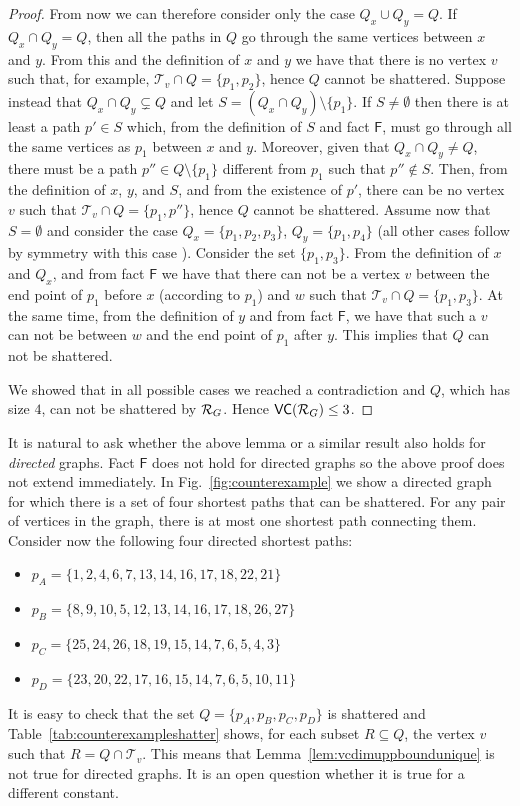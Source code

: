 \begin{proof}
  From now we can therefore consider only the case $Q_x\cup Q_y=Q$. If $Q_x\cap
  Q_y=Q$, then all the paths in $Q$ go through the same vertices between $x$ and
  $y$. From this and the definition of $x$ and $y$ we have that there is no
  vertex $v$ such that, for example, $\mathcal{T}_v\cap Q=\{p_1,p_2\}$, hence
  $Q$ cannot be shattered. Suppose instead that $Q_x\cap Q_y\subsetneq Q$ and let $S=(Q_x\cap
  Q_y)\setminus\{p_1\}$. If $S\neq\emptyset$ then there is at least a path
  $p'\in S$ which, from the definition of $S$ and fact $\mathsf{F}$, must go
  through all the same vertices as $p_1$ between $x$ and $y$. Moreover, given
  that $Q_x\cap Q_y\neq Q$, there must be a path $p''\in Q\setminus\{p_1\}$
  different from $p_1$ such that $p''\notin S$. Then, from the definition of
  $x$, $y$, and $S$, and from the existence of $p'$, there can be no vertex $v$
  such that $\mathcal{T}_v\cap Q=\{p_1,p''\}$, hence $Q$ cannot be shattered.
  Assume now that $S=\emptyset$ and consider the case $Q_x=\{p_1,p_2,p_3\}$,
  $Q_y=\{p_1,p_4\}$ (all other cases follow by symmetry with this case ).
  Consider the set $\{p_1,p_3\}$. From the definition of $x$ and $Q_x$, and from
  fact $\mathsf{F}$ we have that there can not be a vertex $v$ between the end
  point of $p_1$ before $x$ (according to $p_1$) and $w$ such that $\mathcal{T}_v\cap Q=\{p_1,p_3\}$.
  At the same time, from the definition of $y$ and from fact $\mathsf{F}$, we
  have that such a $v$ can not be between $w$ and the end point of $p_1$ after
  $y$. This implies that $Q$ can not be shattered.

  We showed that in all possible cases we reached a contradiction and $Q$,
  which has size $4$, can not be shattered by $\mathcal{R}_G$. Hence $\mathsf{VC}(\mathcal{R}_G)\le
  3$.
\end{proof}

It is natural to ask whether the above lemma or a similar result also holds for
\emph{directed} graphs. Fact $\mathsf{F}$ does not hold for directed graphs so
the above proof does not extend immediately. In Fig.~\ref{fig:counterexample} we show
a directed graph for which there is a set of four shortest paths that can
be shattered. For any pair of vertices in the graph, there is at most one
shortest path connecting them. Consider now the
following four directed shortest paths:
\begin{itemize}
  \item $p_A=\{1,2,4,6,7,13,14,16,17,18,22,21\}$
  \item $p_B=\{8,9,10,5,12,13,14,16,17,18,26,27\}$
  \item $p_C=\{25,24,26,18,19,15,14,7,6,5,4,3\}$
  \item $p_D=\{23,20,22,17,16,15,14,7,6,5,10,11\}$
\end{itemize}
It is easy to check that the set $Q=\{p_A,p_B,p_C,p_D\}$ is shattered and
Table~\ref{tab:counterexampleshatter} shows, for each subset $R\subseteq Q$, the
vertex $v$ such that $R=Q\cap\mathcal{T}_v$. This means that
Lemma~\ref{lem:vcdimuppboundunique} is not true for directed graphs. It is an
open question whether it is true for a different constant.

